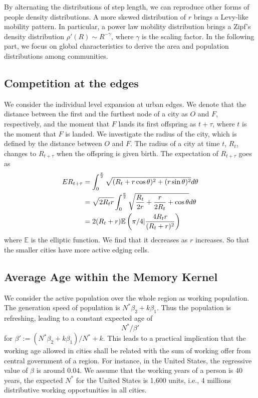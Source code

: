 \documentclass[aps,prl]{revtex4-2}
\begin{document}
By alternating the distributions of step length, we can reproduce other forms of people density distributions. A more skewed distribution of $r$ brings a Levy-like mobility pattern. In particular, a power law mobility distribution brings a Zipf's density distribution $\rho '(R)\sim R^{-\gamma}$\cite{PhysRevX.4.011008}, where $\gamma$ is the scaling factor.  In the following part, we focus on global characteristics to derive the area and population distributions among communities.

\subsection{Competition at the edges}
We consider the individual level expansion at urban edges. We denote that the distance between the first and the furthest node of a city as $O$ and $F$, respectively, and the moment that $F$ lands its first offspring as $t+\tau$, where $t$ is the moment that $F$ is landed. We investigate the radius of the city, which is defined by the distance between $O$ and $F$. The radius of a city at time $t$, $R_t$, changes to $R_{t+\tau}$ when the offspring is given birth. The expectation of $R_{t+\tau}$ goes as 
\begin{align}
	E R_{t+\tau} &= \int_0^{\frac{\pi}{2}} \sqrt{(R_t+r\cos\theta)^2+(r\sin\theta)^2} d\theta \notag \\
	&= \sqrt{2 R_t r} \int_{0}^{\frac{\pi}{2}} \sqrt{\frac{R_{t}}{2 r}+\frac{r}{2 R_{t}}+\cos \theta} d \theta \notag\\
	&= 2(R_t+r) \mathbb{E}\left(\pi/4| \frac{4R_t r}{(R_t+r)^2}\right)
\end{align}where $\mathbb{E}$ is the elliptic function. We find that it decreases as $r$ increases. So that the smaller cities have more active edging cells.

\subsection{Average Age within the Memory Kernel}

We consider the active population over the whole region as working population. The generation speed of population is $N^*\beta_2 + k\beta_1$. Thus the population is refreshing, leading to a constant expected age of \[N^*/\beta'\] for $\beta' := (N^*\beta_2 + k\beta_1)/N^*+k$. This leads to a practical implication that the working age allowed in cities shall be related with the sum of working offer from central government of a region. For instance, in the United States, the regressive value of $\beta$ is around $0.04$. We assume that the working years of a person is 40 years, the expected $N^*$ for the United States is 1,600 units, i.e., 4 millions distributive working opportunities in all cities.
\end{document}
